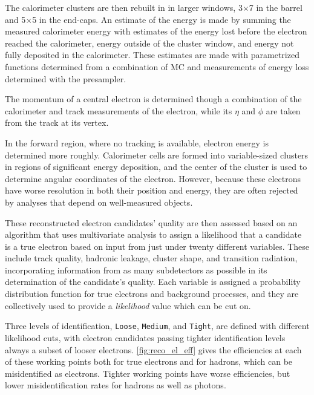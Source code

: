 The calorimeter clusters are then rebuilt in in larger windows, 3$\times$7 in the barrel and 5$\times$5 in the end-caps. An estimate of the energy is made by summing the measured calorimeter energy with estimates of the energy lost before the electron reached the calorimeter, energy outside of the cluster window, and energy not fully deposited in the calorimeter. These estimates are made with parametrized functions determined from a combination of \ac{MC} and measurements of energy loss determined with the presampler. 

The momentum of a central electron is determined though a combination of the calorimeter and track measurements of the electron, while its $\eta$ and $\phi$ are taken from the track at its vertex. 

In the forward region, where no tracking is available, electron energy is determined more roughly. Calorimeter cells are formed into variable-sized clusters in regions of significant energy deposition, and the center of the cluster is used to determine angular coordinates of the electron. However, because these electrons have worse resolution in both their position and energy, they are often rejected by analyses that depend on well-measured objects. 

These reconstructed electron candidates' quality are then assessed based on an algorithm that uses multivariate analysis to assign a likelihood that a candidate is a true electron based on input from just under twenty different variables. These include track quality, hadronic leakage, cluster shape, and transition radiation, incorporating information from as many subdetectors as possible in its determination of the candidate's quality. Each variable is assigned a probability distribution function for true electrons and background processes, and they are collectively used to provide a \textit{likelihood} value which can be cut on. 

Three levels of identification, \texttt{Loose}, \texttt{Medium}, and \texttt{Tight}, are defined with different likelihood cuts, with electron candidates passing tighter identification levels always a subset of looser electrons. \autoref{fig:reco_el_eff} gives the efficiencies at each of these working points both for true electrons and for hadrons, which can be misidentified as electrons. Tighter working points have worse efficiencies, but lower misidentification rates for hadrons as well as photons. 

